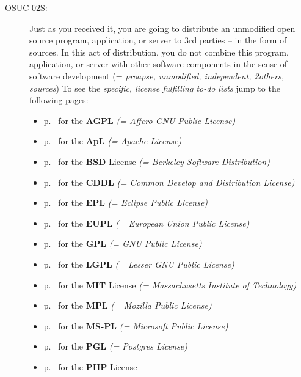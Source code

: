 \begin{description}
\item[OSUC-02S:]\label{OSUC-02S-DEF} Just as you received it, you are going to
distribute an unmodified open source program, application, or server to 3rd
parties -- in the form of sources. In this act of distribution, you do not
combine this program, application, or server with other software components in
the sense of software development (= \textit{proapse, unmodified, independent,
2others, sources}) To see the \textit{specific, license fulfilling to-do lists}
jump to the following pages:
   \begin{itemize}
    \item p.\ \pageref{OSUC-02S-AGPL} for the \textbf{AGPL}
      \textit{(= Affero GNU Public License)} 
    \item p.\ \pageref{OSUC-02S-Apache20} for the \textbf{ApL}
      \textit{(= Apache License)}
    \item p.\ \pageref{OSUC-02S-BSD} for the \textbf{BSD} License
      \textit{(= Berkeley Software Distribution)}
    \item p.\ \pageref{OSUC-02S-CDDL} for the \textbf{CDDL}
      \textit{(= Common Develop and Distribution License)}  
    \item p.\ \pageref{OSUC-02S-EPL} for the \textbf{EPL}
      \textit{(= Eclipse Public License)}     
    \item p.\ \pageref{OSUC-02S-EUPL} for the \textbf{EUPL}
      \textit{(= European Union Public License)} 
    \item p.\ \pageref{OSUC-02S-GPL} for the \textbf{GPL}
       \textit{(= GNU Public License)} 
    \item p.\ \pageref{OSUC-02S-LGPL} for the \textbf{LGPL}
      \textit{(= Lesser GNU Public License)}           
    \item p.\ \pageref{OSUC-02S-MIT} for the \textbf{MIT} License
       \textit{(= Massachusetts Institute of Technology)} 
    \item p.\ \pageref{OSUC-02S-MPL} for the \textbf{MPL}
      \textit{(= Mozilla Public License)}     
    \item p.\ \pageref{OSUC-02S-MS-PL} for the \textbf{MS-PL}
      \textit{(= Microsoft Public License)} 
    \item p.\ \pageref{OSUC-02S-PGL} for the \textbf{PGL}
      \textit{(= Postgres License)} 
    \item p.\ \pageref{OSUC-02S-PHP} for the \textbf{PHP} License 
  \end{itemize}


\end{description}
